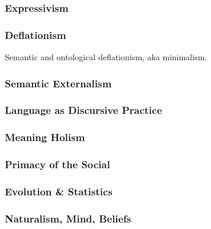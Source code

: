 \documentclass[11pt,twoside]{article}
\begin{document}
\subsubsection{Expressivism}

\subsubsection{Deflationism}

Semantic and ontological deflationism, aka minimalism.

\subsubsection{Semantic Externalism}

\subsubsection{Language as Discursive Practice}

\subsubsection{Meaning Holism}
\subsubsection{Primacy of the Social}
\subsubsection{Evolution \& Statistics}

\subsubsection{Naturalism, Mind, Beliefs}
\end{document}
